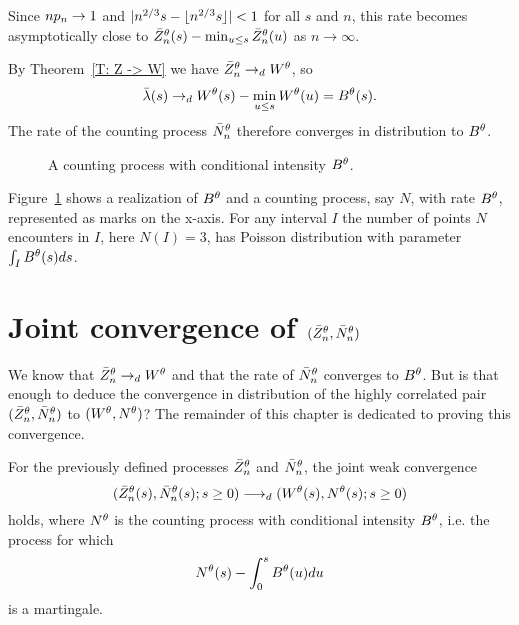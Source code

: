 Since $np_n \rightarrow 1$ and $|n^{2 / 3}s - \lfloor n^{2 / 3}s\rfloor| < 1$ for all $s$ and $n$,
this rate becomes asymptotically close to $\bar{Z}^{\theta}_n(s) - \min_{u \leq s}\bar{Z}^{\theta}_n(u)$ as $n \rightarrow \infty$.

By Theorem~\ref{T: Z -> W} we have $\bar{Z}^{\theta}_n \rightarrow_d W^{\theta}$,
so
\begin{equation}
\bar{\lambda}(s) \rightarrow_d W^{\theta}(s) - \min_{u \leq s}W^{\theta}(u) = B^{\theta}(s).
\end{equation}
The rate of the counting process $\bar{N}_n^{\theta}$ therefore converges in distribution to $B^{\theta}$.

\begin{figure}[ht]
	\centering
	
	\caption{A counting process with conditional intensity $B^{\theta}$.} 
	\label{F: area points}
\end{figure}

Figure~\ref{F: area points} shows a realization of $B^{\theta}$ and a counting process, say $N$, with rate $B^{\theta}$,
represented as marks on the x-axis.
For any interval $I$ the number of points $N$ encounters in $I$, here $N(I) = 3$, 
has Poisson distribution with parameter $\int_{I}B^{\theta}(s)ds$.


\section{Joint convergence of $(\bar{Z}^{\theta}_n, \bar{N}_n^{\theta})$}

We know that $\bar{Z}^{\theta}_n \rightarrow_d W^{\theta}$ and that the rate of $\bar{N}_n^{\theta}$ converges to $B^{\theta}$.
But is that enough to deduce the convergence in distribution of the highly correlated pair $(\bar{Z}^{\theta}_n, \bar{N}_n^{\theta})$ to $(W^{\theta}, N^{\theta})$?
The remainder of this chapter is dedicated to proving this convergence.


\begin{theorem} \label{T: Joint Convergence}
	For the previously defined processes $\bar{Z}^{\theta}_n$ and $\bar{N}_n^{\theta}$,
	the joint weak convergence
	\begin{equation}
	( \bar{Z}^{\theta}_n(s), \bar{N}_n^{\theta}(s); s \geq 0 ) \longrightarrow_d (W^{\theta}(s), N^{\theta}(s); s \geq 0)
	\end{equation}
	holds, where $N^{\theta}$ is the counting process with conditional intensity $B^{\theta}$,
	i.e. the process for which
	\begin{equation*}
	N^{\theta}(s) - \int_{0}^s B^{\theta}(u)du
	\end{equation*}
	is a martingale.
\end{theorem}

